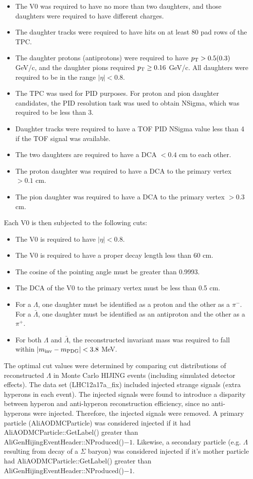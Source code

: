 \begin{itemize}
\item The V0 was required to have no more than two daughters, and those daughters were required to have different charges.
\item The daughter tracks were required to have hits on at least 80 pad rows of the TPC.
\item The daughter protons (antiprotons) were required to have $p_{\rm T} > 0.5 (0.3)$ GeV/c, and the daughter pions required $p_{\rm T} \geq 0.16$ GeV/c.  All daughters were required to be in the range $|\eta| < 0.8$.
\item The TPC was used for PID purposes.  For proton and pion daughter candidates, the PID resolution task was used to obtain NSigma, which was required to be less than 3.
\item Daughter tracks were required to have a TOF PID NSigma value less than 4 if the TOF signal was available.
\item The two daughters are required to have a DCA $< 0.4$ cm to each other.
\item The proton daughter was required to have a DCA to the primary vertex $> 0.1$ cm.
\item The pion daughter was required to have a DCA to the primary vertex $> 0.3$ cm.
\end{itemize}

Each V0 is then subjected to the following cuts:
\begin{itemize}
\item The V0 is required to have $|\eta| < 0.8$.
\item The V0 is required to have a proper decay length less than 60 cm.
\item The cosine of the pointing angle must be greater than 0.9993.
\item The DCA of the V0 to the primary vertex must be less than 0.5 cm.
\item For a $\Lambda$, one daughter must be identified as a proton and the other as a $\pi^-$.  For a $\bar{\Lambda}$, one daughter must be identified as an antiproton and the other as a $\pi^+$.
\item For both $\Lambda$ and $\bar{\Lambda}$, the reconstructed invariant mass was required to fall within $\left\lvert m_\mathrm{inv}-m_\mathrm{PDG}\right\rvert < 3.8$ MeV.
\end{itemize}

The optimal cut values were determined by comparing cut distributions of reconstructed $\Lambda$ in Monte Carlo HIJING events (including simulated detector effects).  The data set (LHC12a17a\_fix) included injected strange signals (extra hyperons in each event).  The injected signals were found to introduce a disparity between hyperon and anti-hyperon reconstruction efficiency, since no anti-hyperons were injected.  Therefore, the injected signals were removed.  A primary particle (AliAODMCParticle) was considered injected if it had AliAODMCParticle::GetLabel() greater than AliGenHijingEventHeader::NProduced()$-1$. Likewise, a secondary particle (e.g. $\Lambda$ resulting from decay of a $\Sigma$ baryon) was considered injected if it's mother particle had AliAODMCParticle::GetLabel() greater than AliGenHijingEventHeader::NProduced()$-1$.

